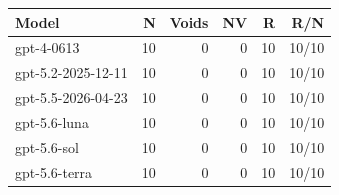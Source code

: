 \begin{tabular}{lrrrrr}
\toprule
Model & N & Voids & NV & R & R/N \\
\midrule
gpt-4-0613 & 10 & 0 & 0 & 10 & 10/10 \\
gpt-5.2-2025-12-11 & 10 & 0 & 0 & 10 & 10/10 \\
gpt-5.5-2026-04-23 & 10 & 0 & 0 & 10 & 10/10 \\
gpt-5.6-luna & 10 & 0 & 0 & 10 & 10/10 \\
gpt-5.6-sol & 10 & 0 & 0 & 10 & 10/10 \\
gpt-5.6-terra & 10 & 0 & 0 & 10 & 10/10 \\
\bottomrule
\end{tabular}
